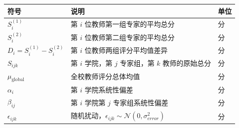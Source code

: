 \documentclass[withoutpreface,bwprint]{cumcmthesis}
\begin{document}


\begin{table}[H]
\centering
\begin{tabularx}{\textwidth}{>{\raggedright\arraybackslash}m{3cm} >{\centering\arraybackslash}X >{\centering\arraybackslash}m{2cm}}
\toprule
\textbf{符号}    & \textbf{说明}    & \textbf{单位} \\
\midrule
$S^{(1)}_i$                    & 第 $i$ 位教师第一组专家的平均总分        & 分 \\
$S^{(2)}_i$                    & 第 $i$ 位教师第二组专家的平均总分        & 分 \\
$D_i = S^{(1)}_i - S^{(2)}_i$  & 第 $i$ 位教师两组评分平均值差异          & 分 \\
$S_{ijk}$                      & 第 $i$ 学院，第 $j$ 专家组，第 $k$ 教师的原始总分 & 分 \\
$\mu_\text{global}$            & 全校教师评分总体均值                      & 分 \\
$\alpha_i$                     & 第 $i$ 学院系统性偏差                    & 分 \\
$\beta_{ij}$                   & 第 $i$ 学院第 $j$ 专家组系统性偏差       & 分 \\
$\epsilon_{ijk}$               & 随机扰动，$\epsilon_{ijk} \sim \mathcal{N}(0, \sigma_{error}^2)$ & 分 \\
\bottomrule
\end{tabularx}
\label{tab:符号说明}
\end{table}
\end{document}
